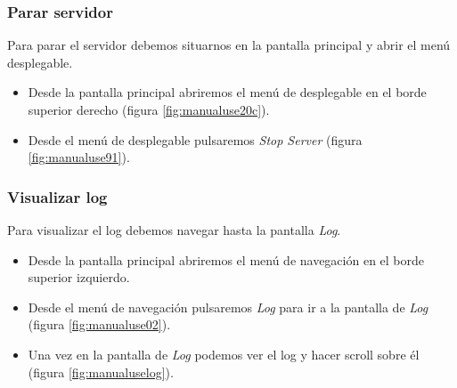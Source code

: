 \subsubsection{Parar servidor}

Para parar el servidor debemos situarnos en la pantalla principal y abrir el menú desplegable.

\begin{itemize}
\item
	Desde la pantalla principal abriremos el menú de desplegable en el borde superior derecho (figura \ref{fig:manualuse20c}).
\item
	Desde el menú de desplegable pulsaremos \textit{Stop Server} (figura \ref{fig:manualuse91}).
\end{itemize}

\subsubsection{Visualizar log}

Para visualizar el log debemos navegar hasta la pantalla \textit{Log}.

\begin{itemize}
\item
	Desde la pantalla principal abriremos el menú de navegación en el borde superior izquierdo.
\item
	Desde el menú de navegación pulsaremos \textit{Log} para ir a la pantalla de \textit{Log} (figura \ref{fig:manualuse02}).
\item
	Una vez en la pantalla de \textit{Log} podemos ver el log y hacer scroll sobre él (figura \ref{fig:manualuselog}).
\end{itemize}


